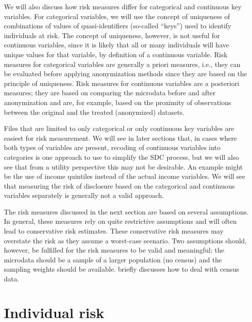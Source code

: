 \documentclass[letterpaper,10pt,english]{sphinxmanual}
\begin{document}
We will also discuss how risk measures differ for categorical and
continuous key variables. For categorical variables, we will use the
concept of uniqueness of combinations of values of quasi-identifiers
(so-called “keys”) used to identify individuals at risk. The concept of
uniqueness, however, is not useful for continuous variables, since it is
likely that all or many individuals will have unique values for that
variable, by definition of a continuous variable. Risk measures for
categorical variables are generally a priori measures, i.e., they can be
evaluated before applying anonymization methods since they are based on
the principle of uniqueness. Risk measures for continuous variables are
a posteriori measures; they are based on comparing the microdata before
and after anonymization and are, for example, based on the proximity of
observations between the original and the treated (anonymized) datasets.

Files that are limited to only categorical or only continuous key
variables are easiest for risk measurement. We will see in later
sections that, in cases where both types of variables are present,
recoding of continuous variables into categories is one approach to use
to simplify the SDC process, but we will also see that from a utility
perspective this may not be desirable. An example might be the use of
income quintiles instead of the actual income variables. We will see
that measuring the risk of disclosure based on the categorical and
continuous variables separately is generally not a valid approach.

The risk measures discussed in the next section are based on several
assumptions. In general, these measures rely on quite restrictive
assumptions and will often lead to conservative risk estimates. These
conservative risk measures may overstate the risk as they assume a
worst-case scenario. Two assumptions should, however, be fulfilled for
the risk measures to be valid and meaningful; the microdata should be a
sample of a larger population (no census) and the sampling weights
should be available. 
briefly discusses how to deal with
census data.


\section{Individual risk}
\label{\detokenize{measure_risk:individual-risk}}
\end{document}
